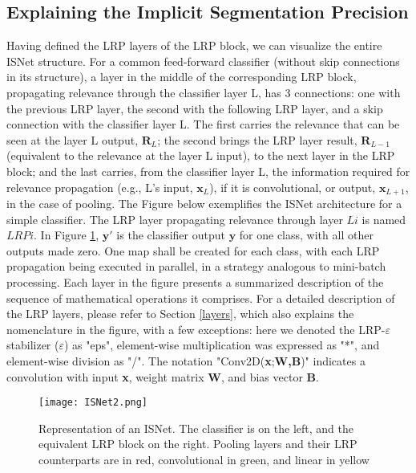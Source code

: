 \documentclass[fleqn,10pt]{wlscirep}
\begin{document}
{\subsection{Explaining the Implicit Segmentation Precision}

Having defined the LRP layers of the LRP block, we can visualize the entire ISNet structure. For a common feed-forward classifier (without skip connections in its structure), a layer in the middle of the corresponding LRP block, propagating relevance through the classifier layer L, has 3 connections: one with the previous LRP layer, the second with the following LRP layer, and a skip connection with the classifier layer L. The first carries the relevance that can be seen at the layer L output, $\bm{R}_{L}$; the second brings the LRP layer result, $\bm{R}_{L-1}$ (equivalent to the relevance at the layer L input), to the next layer in the LRP block; and the last carries, from the classifier layer L, the information required for relevance propagation (e.g., L's input, $\bm{x}_{L}$), if it is convolutional, or output, $\bm{x}_{L+1}$, in the case of pooling. The Figure below exemplifies the ISNet architecture for a simple classifier. The LRP layer propagating relevance through layer $Li$ is named $LRPi$. In Figure \ref{ISNet}, $\bm{y'}$ is the classifier output $\bm{y}$ for one class, with all other outputs made zero. One map shall be created for each class, with each LRP propagation being executed in parallel, in a strategy analogous to mini-batch processing. Each layer in the figure presents a summarized description of the sequence of mathematical operations it comprises. For a detailed description of the LRP layers, please refer to Section \ref{layers}, which also explains the nomenclature in the figure, with a few exceptions: here we denoted the LRP-$\varepsilon$ stabilizer ($\varepsilon$) as "eps", element-wise multiplication was expressed as "*", and element-wise division as "/". The notation "Conv2D(\textbf{x};\textbf{W,B})" indicates a convolution with input \textbf{x}, weight matrix \textbf{W}, and bias vector \textbf{B}.

\begin{figure}[!h]
\texttt{[image: ISNet2.png]}
\centering
\caption{Representation of an ISNet. The classifier is on the left, and the equivalent LRP block on the right. Pooling layers and their LRP counterparts are in red, convolutional in green, and linear in yellow}
\label{ISNet}
\end{figure}

}
\end{document}

